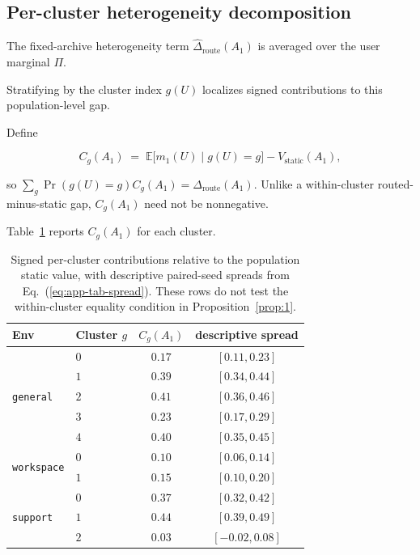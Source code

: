 \documentclass{article} %
\renewcommand{\eqref}[1]{\textup{(\ref{#1})}}
\begin{document}
\subsection{Per-cluster heterogeneity decomposition}

\label{app:tab-cluster}

The fixed-archive heterogeneity term $\widehat\Delta_{\mathrm{route}}(A_1)$ is averaged over the user marginal $\Pi$.

Stratifying by the cluster index \(g(U)\) localizes signed contributions to
this population-level gap.

Define

\begin{equation}
\label{eq:app-tab-clustergap}
C_g(A_1)
\;=\;
\mathbb{E}\big[m_1(U)\mid g(U)=g\big]
- V_{\mathrm{static}}(A_1),
\end{equation}

so \(\sum_g\Pr(g(U)=g)C_g(A_1)=\Delta_{\mathrm{route}}(A_1)\).
Unlike a within-cluster routed-minus-static gap, \(C_g(A_1)\) need not be
nonnegative.

Table~\ref{tab:app-cluster} reports \(C_g(A_1)\) for each cluster.

\begin{table}[h]
\centering
\small
\begin{tabular}{llcc}
\toprule
Env & Cluster $g$ & $C_g(A_1)$ & descriptive spread \\
\midrule
\multirow{5}{*}{\texttt{general}}
 & $0$ & $0.17$ & $[0.11, 0.23]$ \\
 & $1$ & $0.39$ & $[0.34, 0.44]$ \\
 & $2$ & $0.41$ & $[0.36, 0.46]$ \\
 & $3$ & $0.23$ & $[0.17, 0.29]$ \\
 & $4$ & $0.40$ & $[0.35, 0.45]$ \\
\midrule
\multirow{2}{*}{\texttt{workspace}}
 & $0$ & $0.10$ & $[0.06, 0.14]$ \\
 & $1$ & $0.15$ & $[0.10, 0.20]$ \\
\midrule
\multirow{3}{*}{\texttt{support}}
 & $0$ & $0.37$ & $[0.32, 0.42]$ \\
 & $1$ & $0.44$ & $[0.39, 0.49]$ \\
 & $2$ & $0.03$ & $[-0.02, 0.08]$ \\
\bottomrule
\end{tabular}
\caption{Signed per-cluster contributions relative to the population static
value, with descriptive paired-seed spreads from
Eq.~\eqref{eq:app-tab-spread}.
These rows do not test the within-cluster equality condition in
Proposition~\ref{prop:1}.}
\label{tab:app-cluster}
\end{table}
\end{document}

